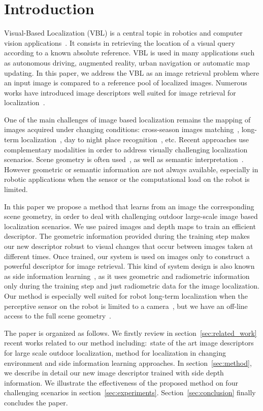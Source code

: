 \section{Introduction}
\label{sec:intro}

Visual-Based Localization (VBL) is a central topic in robotics and computer vision applications~\cite{Piasco2017}. It consists in retrieving the location of a visual query according to a known absolute reference. VBL is used in many applications such as autonomous driving, augmented reality, urban navigation or automatic map updating. In this paper, we address the VBL as an image retrieval problem where an input image is compared to a reference pool of localized images. Numerous works have introduced image descriptors well suited for image retrieval for localization~\cite{Arandjelovic2017,Kim2017a,Gordo2017,Radenovic2017,Liu2018}. 

One of the main challenges of image based localization remains the mapping of images acquired under changing conditions: cross-season images matching~\cite{Naseer2017a}, long-term localization~\cite{Toft2018}, day to night place recognition~\cite{Torii2015}, etc. Recent approaches use complementary modalities in order to address visually challenging localization scenarios. Scene geometry is often used~\cite{Cavallari?,Schonberger2018}, as well as semantic interpretation~\cite{Ardeshir2014,Christie2016,Naseer2017a}. However geometric or semantic information are not always available, especially in robotic applications when the sensor or the computational load on the robot is limited.

In this paper we propose a method that learns from an image the corresponding scene geometry, in order to deal with challenging outdoor large-scale image based localization scenarios. We use paired images and depth maps to train an efficient descriptor. The geometric information provided during the training step makes our new descriptor robust to visual changes that occur between images taken at different times. Once trained, our system is used on images only to construct a powerful descriptor for image retrieval. This kind of system design is also known as side information learning~\cite{Hoffman2016}, as it uses geometric and radiometric information only during the training step and just radiometric data for the image localization. Our method is especially well suited for robot long-term localization when the perceptive sensor on the robot is limited to a camera~\cite{Middelberg2014}, but we have an off-line access to the full scene geometry~\cite{Paparoditis2012,Maddern2016,Wang2016}. 

The paper is organized as follows. We firstly review in section~\ref{sec:related_work} recent works related to our method including:~state of the art image descriptors for large scale outdoor localization, method for localization in changing environment and side information learning approaches. In section~\ref{sec:method}, we describe in detail our new image descriptor trained with side depth information. We illustrate the effectiveness of the proposed method on four challenging scenarios in section~\ref{sec:experiments}. Section~\ref{sec:conclusion} finally concludes the paper.